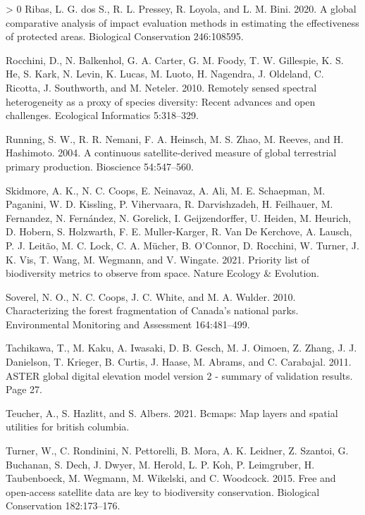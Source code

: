 \documentclass[11pt]{article}
\newlength{\cslhangindent}
\newenvironment{CSLReferences}[3] %
 {%
  \setlength{\parindent}{0pt}
  \ifodd #1 \everypar{\setlength{\hangindent}{\cslhangindent}}\ignorespaces\fi
  \ifnum #2 > 0
  \setlength{\parskip}{#2\baselineskip}
  \fi
 }%
 {}
\begin{document}
\begin{CSLReferences}{1}{0}
\leavevmode\hypertarget{ref-ribasGlobalComparativeAnalysis2020}{}%
Ribas, L. G. dos S., R. L. Pressey, R. Loyola, and L. M. Bini. 2020. A
global comparative analysis of impact evaluation methods in estimating
the effectiveness of protected areas. Biological Conservation
246:108595.

\leavevmode\hypertarget{ref-rocchini2010}{}%
Rocchini, D., N. Balkenhol, G. A. Carter, G. M. Foody, T. W. Gillespie,
K. S. He, S. Kark, N. Levin, K. Lucas, M. Luoto, H. Nagendra, J.
Oldeland, C. Ricotta, J. Southworth, and M. Neteler. 2010. Remotely
sensed spectral heterogeneity as a proxy of species diversity: Recent
advances and open challenges. Ecological Informatics 5:318--329.

\leavevmode\hypertarget{ref-running2004}{}%
Running, S. W., R. R. Nemani, F. A. Heinsch, M. S. Zhao, M. Reeves, and
H. Hashimoto. 2004. A continuous satellite-derived measure of global
terrestrial primary production. Bioscience 54:547--560.

\leavevmode\hypertarget{ref-skidmore2021}{}%
Skidmore, A. K., N. C. Coops, E. Neinavaz, A. Ali, M. E. Schaepman, M.
Paganini, W. D. Kissling, P. Vihervaara, R. Darvishzadeh, H. Feilhauer,
M. Fernandez, N. Fernández, N. Gorelick, I. Geijzendorffer, U. Heiden,
M. Heurich, D. Hobern, S. Holzwarth, F. E. Muller-Karger, R. Van De
Kerchove, A. Lausch, P. J. Leitão, M. C. Lock, C. A. Mücher, B.
O'Connor, D. Rocchini, W. Turner, J. K. Vis, T. Wang, M. Wegmann, and V.
Wingate. 2021. Priority list of biodiversity metrics to observe from
space. Nature Ecology \& Evolution.

\leavevmode\hypertarget{ref-soverelCharacterizingForestFragmentation2010}{}%
Soverel, N. O., N. C. Coops, J. C. White, and M. A. Wulder. 2010.
Characterizing the forest fragmentation of Canada's national parks.
Environmental Monitoring and Assessment 164:481--499.

\leavevmode\hypertarget{ref-tachikawa2011}{}%
Tachikawa, T., M. Kaku, A. Iwasaki, D. B. Gesch, M. J. Oimoen, Z. Zhang,
J. J. Danielson, T. Krieger, B. Curtis, J. Haase, M. Abrams, and C.
Carabajal. 2011. ASTER global digital elevation model version 2 -
summary of validation results. Page 27.

\leavevmode\hypertarget{ref-R-bcmaps}{}%
Teucher, A., S. Hazlitt, and S. Albers. 2021. Bcmaps: Map layers and
spatial utilities for british columbia.

\leavevmode\hypertarget{ref-turner2015}{}%
Turner, W., C. Rondinini, N. Pettorelli, B. Mora, A. K. Leidner, Z.
Szantoi, G. Buchanan, S. Dech, J. Dwyer, M. Herold, L. P. Koh, P.
Leimgruber, H. Taubenboeck, M. Wegmann, M. Wikelski, and C. Woodcock.
2015. Free and open-access satellite data are key to biodiversity
conservation. Biological Conservation 182:173--176.


\end{CSLReferences}
\end{document}
